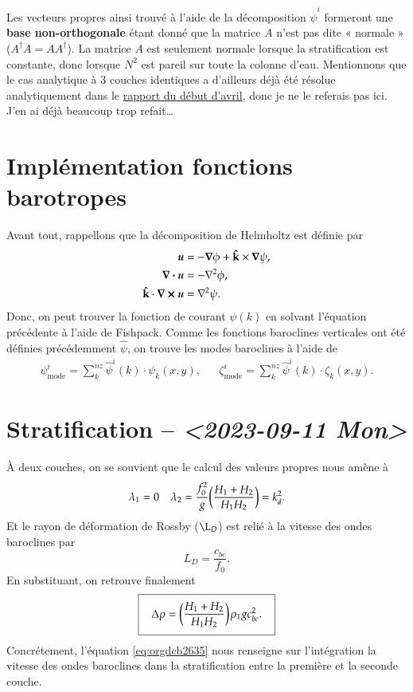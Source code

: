 \documentclass[10pt]{article}
\numberwithin{equation}{section}
\newcommand{\kvf}{\vb{\hat{k}}}
\newcommand{\uu}{\vb*{u}}
\newcommand{\venti}{\vphantom{\sum_x^x}}
\newcommand{\pt}{\hspace{1pt}} %
\begin{document}
Les vecteurs propres ainsi trouvé à l'aide de la décomposition \(\hat{\psi}^i\) formeront une \textbf{base non-orthogonale} étant donné que la matrice \(A\) n'est pas dite « normale » (\(A^\dagger A = A A^\dagger\)).
La matrice \(A\) est seulement normale lorsque la stratification est constante, donc lorsque
\(N^2\) est pareil sur toute la colonne d'eau.
Mentionnons que le cas analytique à 3 couches identiques a d'ailleurs déjà été résolue analytiquement dans le \href{rapport-2023-04-07.pdf}{rapport du début d'avril}, donc je ne le referais pas ici.
J'en ai déjà beaucoup trop refait\ldots{}

\section{Implémentation fonctions barotropes}
\label{sec:org5637380}
Avant tout, rappellons que la décomposition de Helmholtz est définie par
\begin{subequations}
\begin{align}
   \uu &= -\gradient{\phi} + \kvf \times \gradient{\psi},\\
   \divergence{\uu} &= -\laplacian{\phi},\\
   \kvf\cdot\curl{\uu} &= \laplacian{\psi}.
\end{align}
\end{subequations}
Donc, on peut trouver la fonction de courant \(\psi(k)\) en solvant l'équation précédente à l'aide de Fishpack.
Comme les fonctions baroclines verticales ont été définies précédemment \(\hat{\psi}\), on trouve les modes baroclines à l'aide de
\begin{align}
   &&\psi_\text{mode}^i = \sum_k^{nz} \hat{\psi}^i(k)\cdot  \psi_k(x,y),
   &&\zeta_\text{mode}^i = \sum_k^{nz} \hat{\psi}^i(k)\cdot  \zeta_k(x,y).&&
\end{align}



\section{Stratification -- \textit{<2023-09-11 Mon>}}
\label{sec:org6e9cd13}
À deux couches, on se souvient que le calcul des valeurs propres nous amène à
\begin{align}
   && \lambda_1 = 0 && \lambda_2 = \frac{f_0^2}{g} \qty(\frac{H_1+H_2}{H_1 H_2}) = k_d^2. &&
\end{align}
Et le rayon de déformation de Rossby (\(\L_D\)) est relié à la vitesse des ondes baroclines par
\begin{equation}
   L_D = \frac{c_{bc}}{f_0}.
\end{equation}
En substituant, on retrouve finalement
\begin{equation}
\label{eq:orgdcb2635}
   \boxed{\hspace{0.3cm}\Delta\rho = \qty(\frac{H_1+H_2}{H_1H_2})\pt\rho_1 g c_{bc}^2.\venti\hspace{0.3cm}}
\end{equation}
Concrétement, l'équation \ref{eq:orgdcb2635} nous renseigne sur l'intégration la vitesse des ondes baroclines dans la stratification entre la première et la seconde couche.
\end{document}
